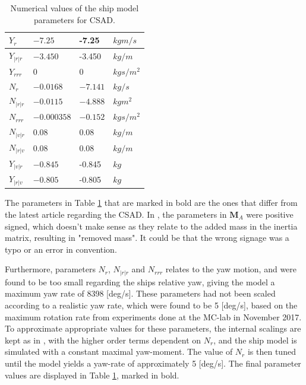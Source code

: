 \begin{table}[h!]
\begin{tabular}{| p{2cm} | p{2cm} | p{3cm} | p{2cm}|}
$Y_r$ & $-7.25$ &-7.25 &$kgm/s$\\ \hline
$Y_{|r|r}$ & $-3.450$&-3.450 & $kg/m$\\ \hline
$Y_{rrr}$ & $0$&0 & $kgs/m^2$\\ \hline
$N_r$ & $-0.0168$ & $\boldsymbol{-7.141}$ &$kg/s$\\ \hline
$N_{|r|r}$ & $-0.0115$&$ \boldsymbol{-4.888} $& $kgm^2$\\ \hline
$N_{rrr}$ & $-0.000358$&$\boldsymbol{-0.152}$ & $kgs/m^2$\\ \hline
$N_{|v|r}$ & $0.08$&0.08 & $kg/m$\\ \hline
$N_{|r|v}$ & $0.08$& 0.08& $kg/m$\\ \hline
$Y_{|v|r}$ & $-0.845$ &-0.845 &$kg$\\ \hline
$Y_{|r|v}$ & $-0.805$ & -0.805&$kg$\\ \hline
\end{tabular}
\caption{Numerical values of the ship model parameters for CSAD.}
\label{CSADParameters}
\end{table}

The parameters in Table \ref{CSADParameters} that are marked in bold are the ones that differ from the latest article regarding the CSAD. In \cite{bjørnø2017}, the parameters in $\boldsymbol{M}_A$ were positive signed, which doesn't make sense as they relate to the added mass in the inertia matrix, resulting in "removed mass". It could be that the wrong signage was a typo or an error in convention. 

Furthermore, parameters $N_r$, $N_{|r|r}$ and $N_{rrr}$ relates to the yaw motion, and were found to be too small regarding the ships relative yaw, giving the model a maximum yaw rate of 8398 [deg/s].
These parameters had not been scaled according to a realistic yaw rate, which were found to be 5 [deg/s], based on the maximum rotation rate from experiments done at the MC-lab in November 2017. To approximate appropriate values for these parameters, the internal scalings are kept as in \cite{bjørnø2017}, with the higher order terms dependent on $N_r$, and the ship model is simulated with a constant maximal yaw-moment. The value of $N_r$ is then tuned until the model yields a yaw-rate of approximately 5 [deg/s]. The final parameter values are displayed in Table \ref{CSADParameters}, marked in bold.





